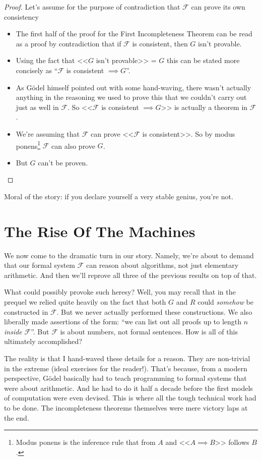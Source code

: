\documentclass{article}
\theoremstyle{customstyle}
\newcommand{\F}{\ensuremath{\mathcal{F}}}
\begin{document}
\begin{proof}
Let's assume for the purpose of contradiction that $\F$ can prove its own consistency
\begin{itemize}[topsep=0.5em]
\item The first half of the proof for the First Incompleteness Theorem can be read as a proof by contradiction that if $\F$ is consistent, then $G$ isn't provable.
\item Using the fact that <<$G$ isn't provable>> = $G$ this can be stated more concisely as ``$\F$ is consistent $\implies G$''.
\item As Gödel himself pointed out with some hand-waving, there wasn't actually anything in the reasoning we used to prove this that we couldn't carry out just as well in $\F$. So <<$\F$ is consistent $\implies G$>> is actually a theorem in $\F$.
\item We're assuming that $\F$ can prove <<$\F$ is consistent>>. So by modus ponens\footnote{Modus ponens is the inference rule that from $A$ and <<$A \implies B$>> follows $B$.} $\F$ can also prove $G$.
\item But $G$ can't be proven. \lightning
\end{itemize}
\end{proof}

Moral of the story: if you declare yourself a very stable genius, you're not.\cite{trump}

\section{The Rise Of The Machines}

We now come to the dramatic turn in our story. Namely, we're about to demand that our formal system $\F$ can reason about algorithms, not just elementary arithmetic. And then we'll reprove all three of the previous results on top of that.

What could possibly provoke such heresy? Well, you may recall that in the prequel we relied quite heavily on the fact that both $G$ and $R$ could \textit{somehow} be constructed in $\F$. But we never actually performed these constructions. We also liberally made assertions of the form: ``we can list out all proofs up to length $n$ \textit{inside} $\F$''. But $\F$ is about numbers, not formal sentences. How is all of this ultimately accomplished?

The reality is that I hand-waved these details for a reason. They are non-trivial in the extreme (ideal exercises for the reader!). That's because, from a modern perspective, Gödel basically had to teach programming to formal systems that were about arithmetic. And he had to do it half a decade before the first models of computation were even devised. This is where all the tough technical work had to be done. The incompleteness theorems themselves were mere victory laps at the end.
\end{document}
